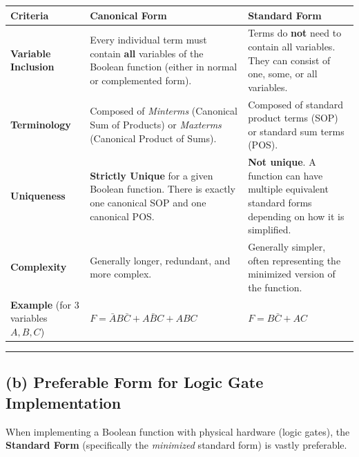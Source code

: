 \documentclass[12pt,a3paper]{article}
\begin{document}
\begin{enumerate}
\begin{tcolorbox}[enhanced,breakable,ansbox,colback=cB!4,colframe=cB,boxrule=0.8pt,arc=5pt,title={\textbf{Answer}},fonttitle=\bfseries\color{white},colbacktitle=cB]
\begin{center}
\renewcommand{\arraystretch}{1.5}
\begin{tabular}{p{3.5cm} p{5.5cm} p{5.5cm}}
    \toprule
    \textbf{Criteria} & \textbf{Canonical Form} & \textbf{Standard Form} \\
    \midrule
    \textbf{Variable Inclusion} & Every individual term must contain \textbf{all} variables of the Boolean function (either in normal or complemented form). & Terms do \textbf{not} need to contain all variables. They can consist of one, some, or all variables. \\
    \textbf{Terminology} & Composed of \textit{Minterms} (Canonical Sum of Products) or \textit{Maxterms} (Canonical Product of Sums). & Composed of standard product terms (SOP) or standard sum terms (POS). \\
    \textbf{Uniqueness} & \textbf{Strictly Unique} for a given Boolean function. There is exactly one canonical SOP and one canonical POS. & \textbf{Not unique}. A function can have multiple equivalent standard forms depending on how it is simplified. \\
    \textbf{Complexity} & Generally longer, redundant, and more complex. & Generally simpler, often representing the minimized version of the function. \\
    \textbf{Example} (for 3 variables $A,B,C$) & $F = \bar{A}B\bar{C} + A\bar{B}C + ABC$ & $F = B\bar{C} + AC$ \\
    \bottomrule
\end{tabular}
\end{center}

\vspace{0.3cm}
\hrule
\vspace{0.3cm}

\subsection*{(b) Preferable Form for Logic Gate Implementation}

When implementing a Boolean function with physical hardware (logic gates), the \textbf{\textcolor{cA}{Standard Form}} (specifically the \textit{minimized} standard form) is vastly preferable. 


\end{tcolorbox}
\end{enumerate}
\end{document}
